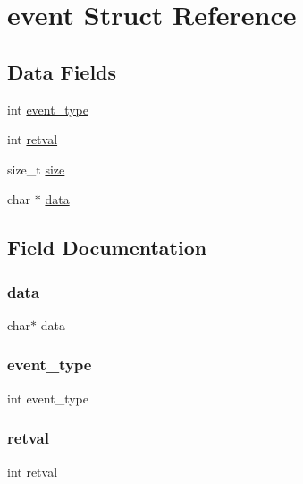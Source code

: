 \hypertarget{structevent}{}\section{event Struct Reference}
\label{structevent}
\subsection*{Data Fields}
\begin{DoxyCompactItemize}
\item 
int \hyperlink{structevent_afc1309cf76ca8d8c896773d580fa7249}{event\+\_\+type}
\item 
int \hyperlink{structevent_a7f345697df7eb20c9aba1ab6980cae8f}{retval}
\item 
size\+\_\+t \hyperlink{structevent_a854352f53b148adc24983a58a1866d66}{size}
\item 
char $\ast$ \hyperlink{structevent_a91a70b77df95bd8b0830b49a094c2acb}{data}
\end{DoxyCompactItemize}


\subsection{Field Documentation}
\hypertarget{structevent_a91a70b77df95bd8b0830b49a094c2acb}{}\label{structevent_a91a70b77df95bd8b0830b49a094c2acb} 
\subsubsection{\texorpdfstring{data}{data}}
{\footnotesize\ttfamily char$\ast$ data}

\hypertarget{structevent_afc1309cf76ca8d8c896773d580fa7249}{}\label{structevent_afc1309cf76ca8d8c896773d580fa7249} 
\subsubsection{\texorpdfstring{event\+\_\+type}{event\_type}}
{\footnotesize\ttfamily int event\+\_\+type}

\hypertarget{structevent_a7f345697df7eb20c9aba1ab6980cae8f}{}\label{structevent_a7f345697df7eb20c9aba1ab6980cae8f} 
\subsubsection{\texorpdfstring{retval}{retval}}
{\footnotesize\ttfamily int retval}

